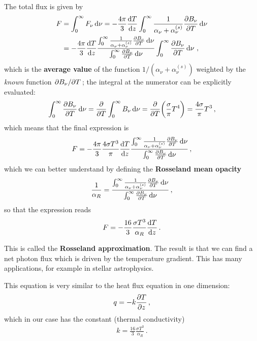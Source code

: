 \documentclass[main.tex]{subfiles}
\begin{document}
The total flux is given by 
%
\begin{align}
F &= \int_{0}^{\infty } F_\nu \dd{\nu } = 
- \frac{4 \pi }{3} \dv{T}{z} \int_0^{\infty } \frac{1}{\alpha_{\nu } + \alpha_{\nu}^{(s)}} \pdv{B_\nu }{T} \dd{\nu }  \\
&= - \frac{4 \pi }{3} \dv{T}{z}
\frac{\int_0^{\infty } \frac{1}{\alpha_{\nu } + \alpha_{\nu}^{(s)}} \pdv{B_\nu }{T} \dd{\nu }}{
\int_0^{\infty } \pdv{B_\nu }{T} \dd{\nu }
}
\int_0^{\infty } \pdv{B_\nu }{T} \dd{\nu }
\,,
\end{align}
%
which is the \textbf{average value} of the function \(1 / (\alpha_{\nu }+ \alpha_{\nu }^{(s)})\) weighted by the \emph{known} function \(\pdv*{B_\nu }{T}\); the integral at the numerator can be explicitly evaluated: 
%
\begin{align}
\int_0^{\infty } \pdv{B_\nu }{T} \dd{\nu }
= \pdv{}{T} \int_{0}^{\infty} B_\nu \dd{\nu }
= \pdv{}{T} \qty( \frac{\sigma}{\pi } T^{4}) 
= \frac{4 \sigma }{\pi } T^3
\,,
\end{align}
%
which means that the final expression is 
%
\begin{align}
F = - \frac{4 \pi }{3} \frac{4 \sigma T^3}{\pi } \dv{T}{z}  
\frac{\int_0^{\infty } \frac{1}{\alpha_{\nu } + \alpha_{\nu}^{(s)}} \pdv{B_\nu }{T} \dd{\nu }}{
\int_0^{\infty } \pdv{B_\nu }{T} \dd{\nu }
}
\,,
\end{align}
%
which we can better understand by defining the \textbf{Rosseland mean opacity} 
%
\begin{align}
\frac{1}{\alpha_{R}} = \frac{\int_0^{\infty } \frac{1}{\alpha_{\nu } + \alpha_{\nu}^{(s)}} \pdv{B_\nu }{T} \dd{\nu }}{
\int_0^{\infty } \pdv{B_\nu }{T} \dd{\nu }
}
\,,
\end{align}
%
so that the expression reads 
%
\begin{align}
F = - \frac{16}{3} \frac{\sigma T^3}{\alpha_{R}} \dv{T}{z}
\,.
\end{align}

This is called the \textbf{Rosseland approximation}. The result is that we can find a net photon flux which is driven by the temperature gradient. 
This has many applications, for example in stellar astrophysics. 

This equation is very similar to the heat flux equation in one dimension: 
%
\begin{align}
q = - k \pdv{T}{z}
\,,
\end{align}
%
which in our case has the constant (thermal conductivity) 
%
\begin{align}
k = \frac{16}{3} \frac{\sigma T^3}{\alpha_{R}}
\,.
\end{align}
\end{document}
